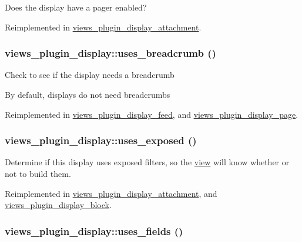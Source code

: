 Does the display have a pager enabled? 

Reimplemented in \hyperlink{classviews__plugin__display__attachment_0a08a465f715c107a2dfaf9bd5dd1538}{views\_\-plugin\_\-display\_\-attachment}.\hypertarget{classviews__plugin__display_b3d2779948700bcc6c5ee3b26726f468}{
\subsubsection[{uses\_\-breadcrumb}]{\setlength{\rightskip}{0pt plus 5cm}views\_\-plugin\_\-display::uses\_\-breadcrumb ()}}
\label{classviews__plugin__display_b3d2779948700bcc6c5ee3b26726f468}


Check to see if the display needs a breadcrumb

By default, displays do not need breadcrumbs 

Reimplemented in \hyperlink{classviews__plugin__display__feed_4bc729e21f5578c13d420bbaf3c388c5}{views\_\-plugin\_\-display\_\-feed}, and \hyperlink{classviews__plugin__display__page_cbdafb32168f809b28e083d654399f3f}{views\_\-plugin\_\-display\_\-page}.\hypertarget{classviews__plugin__display_5bfcb22187618f52bea9ea626aff18a4}{
\subsubsection[{uses\_\-exposed}]{\setlength{\rightskip}{0pt plus 5cm}views\_\-plugin\_\-display::uses\_\-exposed ()}}
\label{classviews__plugin__display_5bfcb22187618f52bea9ea626aff18a4}


Determine if this display uses exposed filters, so the \hyperlink{classview}{view} will know whether or not to build them. 

Reimplemented in \hyperlink{classviews__plugin__display__attachment_f62963a58736c80a5750c87588fb093a}{views\_\-plugin\_\-display\_\-attachment}, and \hyperlink{classviews__plugin__display__block_b0995994a4c7436de2790c7ad8d7ea74}{views\_\-plugin\_\-display\_\-block}.\hypertarget{classviews__plugin__display_2476af1c5eb02a69a5a94d0e2f391987}{
\subsubsection[{uses\_\-fields}]{\setlength{\rightskip}{0pt plus 5cm}views\_\-plugin\_\-display::uses\_\-fields ()}}
\label{classviews__plugin__display_2476af1c5eb02a69a5a94d0e2f391987}


